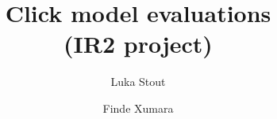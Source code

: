 \documentclass{llncs} %
\title{
Click model evaluations\\
\small {(IR2 project)}
}
\author{
Luka Stout
\and
Finde Xumara
}
\institute{University of Amsterdam}
\begin{document}
\nocite{*}
\maketitle







{}


\newpage

\end{document}
